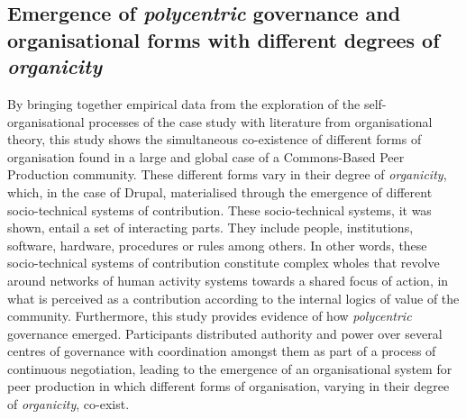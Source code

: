 \subsection{Emergence of \textit{polycentric} governance and organisational forms with different degrees of \textit{organicity}}

By bringing together empirical data from the exploration of the self-organisational processes of the case study with literature from organisational theory, this study shows the simultaneous co-existence of different forms of organisation found in a large and global case of a Commons-Based Peer Production community. These different forms vary in their degree of \textit{organicity}, which, in the case of Drupal, materialised through the emergence of different socio-technical systems of contribution. These socio-technical systems, it was shown, entail a set of interacting parts. They include people, institutions, software, hardware, procedures or rules among others. In other words, these socio-technical systems of contribution constitute complex wholes that revolve around networks of human activity systems towards a shared focus of action, in what is perceived as a contribution according to the internal logics of value of the community. Furthermore, this study provides evidence of how \textit{polycentric} governance emerged. Participants distributed authority and power over several centres of governance with coordination amongst them as part of a process of continuous negotiation, leading to the emergence of an organisational system for peer production in which different forms of organisation, varying in their degree of \textit{organicity}, co-exist.

